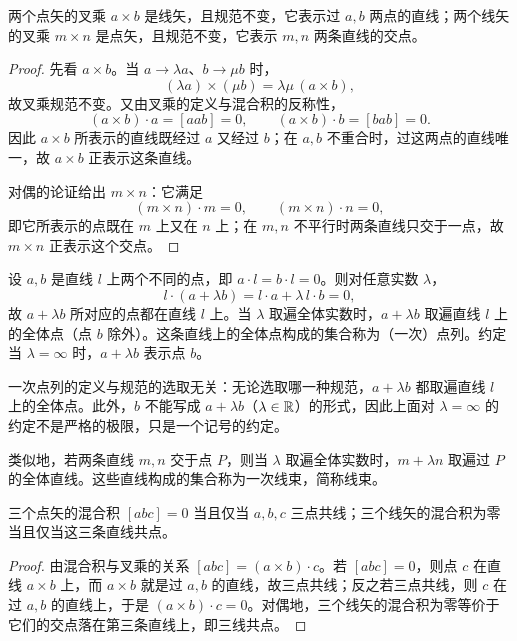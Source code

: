 \begin{proposition}\label{prop:cross}
两个点矢的叉乘 $a\times b$ 是线矢，且规范不变，它表示过 $a,b$ 两点的直线；两个线矢的叉乘 $m\times n$ 是点矢，且规范不变，它表示 $m,n$ 两条直线的交点。
\end{proposition}

\begin{proof}
先看 $a\times b$。当 $a\to\lambda a$、$b\to\mu b$ 时，
\[
(\lambda a)\times(\mu b)=\lambda\mu\,(a\times b),
\]
故叉乘规范不变。又由叉乘的定义与混合积的反称性，
\[
(a\times b)\cdot a=[aab]=0,\qquad (a\times b)\cdot b=[bab]=0 .
\]
因此 $a\times b$ 所表示的直线既经过 $a$ 又经过 $b$；在 $a,b$ 不重合时，过这两点的直线唯一，故 $a\times b$ 正表示这条直线。

对偶的论证给出 $m\times n$：它满足
\[
(m\times n)\cdot m=0,\qquad (m\times n)\cdot n=0,
\]
即它所表示的点既在 $m$ 上又在 $n$ 上；在 $m,n$ 不平行时两条直线只交于一点，故 $m\times n$ 正表示这个交点。
\end{proof}

\begin{definition}[一次点列]
设 $a,b$ 是直线 $l$ 上两个不同的点，即 $a\cdot l=b\cdot l=0$。则对任意实数 $\lambda$，
\[
l\cdot(a+\lambda b)=l\cdot a+\lambda\,l\cdot b=0,
\]
故 $a+\lambda b$ 所对应的点都在直线 $l$ 上。当 $\lambda$ 取遍全体实数时，$a+\lambda b$ 取遍直线 $l$ 上的全体点（点 $b$ 除外）。这条直线上的全体点构成的集合称为（一次）点列。约定当 $\lambda=\infty$ 时，$a+\lambda b$ 表示点 $b$。
\end{definition}

\begin{remark}
一次点列的定义与规范的选取无关：无论选取哪一种规范，$a+\lambda b$ 都取遍直线 $l$ 上的全体点。此外，$b$ 不能写成 $a+\lambda b$（$\lambda\in\mathbb{R}$）的形式，因此上面对 $\lambda=\infty$ 的约定不是严格的极限，只是一个记号的约定。
\end{remark}

\begin{definition}[一次线束]
类似地，若两条直线 $m,n$ 交于点 $P$，则当 $\lambda$ 取遍全体实数时，$m+\lambda n$ 取遍过 $P$ 的全体直线。这些直线构成的集合称为一次线束，简称线束。
\end{definition}

\begin{proposition}
三个点矢的混合积 $[abc]=0$ 当且仅当 $a,b,c$ 三点共线；三个线矢的混合积为零当且仅当这三条直线共点。
\end{proposition}

\begin{proof}
由混合积与叉乘的关系 $[abc]=(a\times b)\cdot c$。若 $[abc]=0$，则点 $c$ 在直线 $a\times b$ 上，而 $a\times b$ 就是过 $a,b$ 的直线，故三点共线；反之若三点共线，则 $c$ 在过 $a,b$ 的直线上，于是 $(a\times b)\cdot c=0$。对偶地，三个线矢的混合积为零等价于它们的交点落在第三条直线上，即三线共点。
\end{proof}

